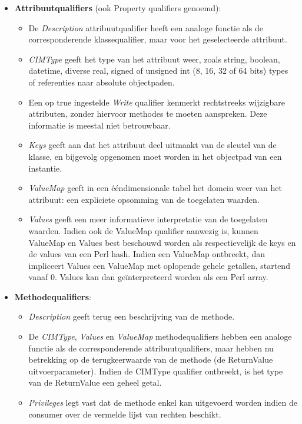 \documentclass[11pt,a4paper]{report}
\begin{document}
\begin{itemize}
	\item \textbf{Attribuutqualifiers} (ook Property qualifiers genoemd):
	\begin{itemize}
		\item De \textit{Description} attribuutqualifier heeft een analoge functie als de corresponderende klassequalifier, maar voor het geselecteerde attribuut.
		\item \textit{CIMType} geeft het type van het attribuut weer, zoals string, boolean, datetime, diverse real, signed of unsigned int (8, 16, 32 of 64 bits) types of referenties naar absolute objectpaden.
		\item Een op true ingestelde \textit{Write} qualifier kenmerkt rechtstreeks wijzigbare attributen, zonder hiervoor methodes te moeten aanspreken. Deze informatie is meestal niet betrouwbaar.
		\item \textit{Keys} geeft aan dat het attribuut deel uitmaakt van de sleutel van de klasse, en bijgevolg opgenomen moet worden in het objectpad van een instantie.
		\item \textit{ValueMap} geeft in een ééndimensionale tabel het domein weer van het attribuut: een expliciete opsomming van de toegelaten waarden.
		\item \textit{Values} geeft een meer informatieve interpretatie van de toegelaten waarden. Indien ook de ValueMap qualifier aanwezig is, kunnen ValueMap en Values best beschouwd worden als respectievelijk de keys en de values van een Perl hash. Indien een ValueMap ontbreekt, dan impliceert Values een ValueMap met oplopende gehele getallen, startend vanaf 0. Values kan dan geïnterpreteerd worden als een Perl array.
	\end{itemize}
	\newpage
	\item \textbf{Methodequalifiers}:
	\begin{itemize}
		\item \textit{Description} geeft terug een beschrijving van de methode.
		\item De \textit{CIMType}, \textit{Values} en \textit{ValueMap} methodequalifiers hebben een analoge functie als de corresponderende attribuutqualifiers, maar hebben nu betrekking op de terugkeerwaarde van de methode (de ReturnValue uitvoerparameter). Indien de CIMType qualifier ontbreekt, is het type van de ReturnValue een geheel getal.
		\item \textit{Privileges} legt vast dat de methode enkel kan uitgevoerd worden indien de consumer over de vermelde lijst van rechten beschikt.
	\end{itemize}
	

\end{itemize}
\end{document}
